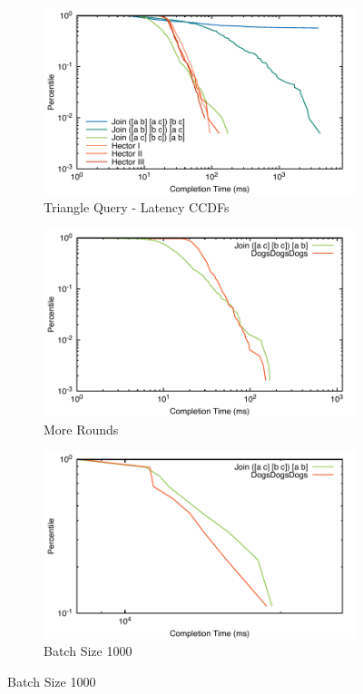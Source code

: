 \documentclass[../catalog.tex]{subfiles}
\begin{document}
\begin{figure}[h!]
  \begin{subfigure}{1.0\textwidth}
    \includegraphics[width=1.0\linewidth]{results/triangles/out/all_cdfs}
    \caption{Triangle Query - Latency CCDFs}
    \label{fig:triangle-cdfs}
  \end{subfigure}
  \begin{subfigure}{.5\textwidth}
    \includegraphics[width=1.0\linewidth]{results/triangles/out/extended_cdf}
    \caption{More Rounds}
    \label{fig:triangle-cdfs-extended}
  \end{subfigure}
  \begin{subfigure}{.5\textwidth}
    \includegraphics[width=1.0\linewidth]{results/triangles/out/batch_cdf}
    \caption{Batch Size 1000}
    \label{fig:triangle-cdfs-batch}
  \end{subfigure}


\end{figure}
\end{document}
